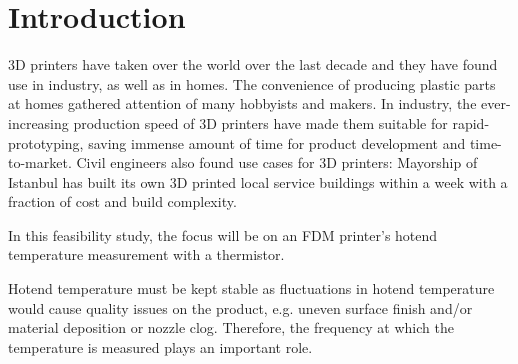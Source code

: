\chapter*{Introduction}
3D printers have taken over the world over the last decade and
they have
found use in industry, as well as in homes. The convenience of producing
plastic parts at homes gathered attention of many hobbyists and makers. In
industry, the ever-increasing production speed of 3D printers have made
them suitable for rapid-prototyping, saving immense amount of time for
product development and time-to-market. Civil engineers also found use
cases for 3D printers: Mayorship of Istanbul has built its own 3D printed
local service buildings within a week with a fraction of cost and build
complexity.

In this feasibility study, the focus will be on an FDM printer's hotend
temperature measurement with a thermistor.

Hotend temperature must be kept stable as fluctuations in hotend
temperature would cause quality issues on the product, e.g. uneven surface
finish and/or material deposition or nozzle clog. Therefore, the frequency
at which the temperature is measured plays an important role.